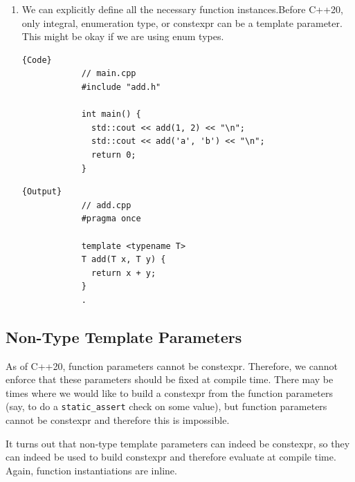\documentclass{article}
\newcounter{definition}[section]
\begin{document}
\begin{lemma}
\begin{enumerate}
        \item We can explicitly define all the necessary function instances.Before C++20, only integral, enumeration type, or constexpr can be a template parameter. This might be okay if we are using enum types. 

        \noindent\begin{minipage}{.45\textwidth}
          \begin{lstlisting}[]{Code}
            // main.cpp
            #include "add.h"

            int main() {
              std::cout << add(1, 2) << "\n";
              std::cout << add('a', 'b') << "\n";
              return 0;
            }
          \end{lstlisting}
          \end{minipage}
          \hfill
          \begin{minipage}{.44\textwidth}
          \begin{lstlisting}[]{Output}
            // add.cpp
            #pragma once

            template <typename T>
            T add(T x, T y) {
              return x + y;
            }
            .
          \end{lstlisting}
        \end{minipage}


      \end{enumerate}
    \end{lemma}

  \subsection{Non-Type Template Parameters} 

    As of C++20, function parameters cannot be constexpr. Therefore, we cannot enforce that these parameters should be fixed at compile time. There may be times where we would like to build a constexpr from the function parameters (say, to do a \texttt{static\_assert} check on some value), but function parameters cannot be constexpr and therefore this is impossible. 

    \begin{definition}
      \label{def:non-type-template-parameters}
      It turns out that non-type template parameters can indeed be constexpr, so they can indeed be used to build constexpr and therefore evaluate at compile time. Again, function instantiations are inline. 
    \end{definition}
\end{document}
